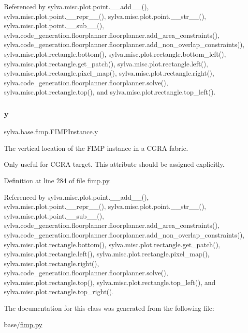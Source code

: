 Referenced by sylva.\+misc.\+plot.\+point.\+\_\+\+\_\+add\+\_\+\+\_\+(), sylva.\+misc.\+plot.\+point.\+\_\+\+\_\+repr\+\_\+\+\_\+(), sylva.\+misc.\+plot.\+point.\+\_\+\+\_\+str\+\_\+\+\_\+(), sylva.\+misc.\+plot.\+point.\+\_\+\+\_\+sub\+\_\+\+\_\+(), sylva.\+code\+\_\+generation.\+floorplanner.\+floorplanner.\+add\+\_\+area\+\_\+constraints(), sylva.\+code\+\_\+generation.\+floorplanner.\+floorplanner.\+add\+\_\+non\+\_\+overlap\+\_\+constraints(), sylva.\+misc.\+plot.\+rectangle.\+bottom(), sylva.\+misc.\+plot.\+rectangle.\+bottom\+\_\+left(), sylva.\+misc.\+plot.\+rectangle.\+get\+\_\+patch(), sylva.\+misc.\+plot.\+rectangle.\+left(), sylva.\+misc.\+plot.\+rectangle.\+pixel\+\_\+map(), sylva.\+misc.\+plot.\+rectangle.\+right(), sylva.\+code\+\_\+generation.\+floorplanner.\+floorplanner.\+solve(), sylva.\+misc.\+plot.\+rectangle.\+top(), and sylva.\+misc.\+plot.\+rectangle.\+top\+\_\+left().

\mbox{\label{classsylva_1_1base_1_1fimp_1_1_f_i_m_p_instance_aeca18b6f2bd24ee58b428a2f7fc90d2f}} 
\subsubsection{\texorpdfstring{y}{y}}
{\footnotesize\ttfamily sylva.\+base.\+fimp.\+F\+I\+M\+P\+Instance.\+y}



The vertical location of the F\+I\+MP instance in a C\+G\+RA fabric. 

Only useful for C\+G\+RA target. This attribute should be assigned explicitly. 

Definition at line 284 of file fimp.\+py.



Referenced by sylva.\+misc.\+plot.\+point.\+\_\+\+\_\+add\+\_\+\+\_\+(), sylva.\+misc.\+plot.\+point.\+\_\+\+\_\+repr\+\_\+\+\_\+(), sylva.\+misc.\+plot.\+point.\+\_\+\+\_\+str\+\_\+\+\_\+(), sylva.\+misc.\+plot.\+point.\+\_\+\+\_\+sub\+\_\+\+\_\+(), sylva.\+code\+\_\+generation.\+floorplanner.\+floorplanner.\+add\+\_\+area\+\_\+constraints(), sylva.\+code\+\_\+generation.\+floorplanner.\+floorplanner.\+add\+\_\+non\+\_\+overlap\+\_\+constraints(), sylva.\+misc.\+plot.\+rectangle.\+bottom(), sylva.\+misc.\+plot.\+rectangle.\+get\+\_\+patch(), sylva.\+misc.\+plot.\+rectangle.\+left(), sylva.\+misc.\+plot.\+rectangle.\+pixel\+\_\+map(), sylva.\+misc.\+plot.\+rectangle.\+right(), sylva.\+code\+\_\+generation.\+floorplanner.\+floorplanner.\+solve(), sylva.\+misc.\+plot.\+rectangle.\+top(), sylva.\+misc.\+plot.\+rectangle.\+top\+\_\+left(), and sylva.\+misc.\+plot.\+rectangle.\+top\+\_\+right().



The documentation for this class was generated from the following file\+:\begin{DoxyCompactItemize}
\item 
base/\hyperlink{fimp_8py}{fimp.\+py}\end{DoxyCompactItemize}
